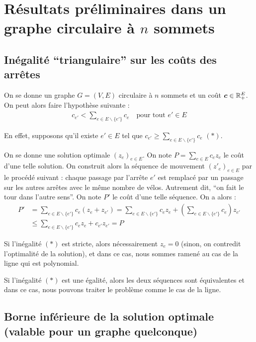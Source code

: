 \documentclass[twoside,11pt,openany,a4paper]{rapport}
\begin{document}
\chapter{Résultats préliminaires dans un graphe circulaire à $n$ sommets}
\label{Résultats préliminaires}

\section{Inégalité ``triangulaire'' sur les coûts des arrêtes}
\label{sec: Inégalité triangulaire}

On se donne un graphe $G=(V,E)$ circulaire à $n$ sommets et un coût $\boldsymbol{c} \in \mathbb{R}^E_+$. On peut alors faire l'hypothèse suivante :
\begin{gather}\label{Inégalité Triangulaire}
  c_{e'}<\sum_{e \in E \backslash \{e'\}} c_e \quad \text{pour tout } e' \in E
\end{gather}

En effet, supposons qu'il existe $e' \in E$ tel que $c_{e'} \ge \sum_{e \in E \backslash \{e'\}} c_e$ $(*)$.

On se donne une solution optimale $(z_e)_{e \in E}$. On note $P = \sum_{e \in E} c_ez_e$ le coût d'une telle solution. On construit alors la séquence de mouvement $(z'_e)_{e \in E}$ par le procédé suivant : chaque passage par l'arrête $e'$ est remplacé par un passage sur les autres arrêtes avec le même nombre de vélos. Autrement dit, ``on fait le tour dans l'autre sens''. On note $P'$ le coût d'une telle séquence. On a alors :
\begin{align*}
  P' &= \sum_{e \in E \backslash \{e'\}} c_e (z_e + z_{e'}) = \sum_{e \in E \backslash \{e'\}} c_ez_e + \left(\sum_{e \in E \backslash \{e'\}} c_{e}\right)z_{e'} \\
     &\le \sum_{e \in E \backslash \{e'\}} c_ez_e + c_{e'}z_{e'} = P
\end{align*}

Si l'inégalité $(*)$ est stricte, alors nécessairement $z_e = 0$ (sinon, on contredit l'optimalité de la solution), et dans ce cas, nous sommes ramené au cas de la ligne qui est polynomial.

Si l'inégalité $(*)$ est une égalité, alors les deux séquences sont équivalentes et dans ce cas, nous pouvons traiter le problème comme le cas de la ligne.

\section{Borne inférieure de la solution optimale (valable pour un graphe quelconque)}
\label{Borne inf générale}
\end{document}
